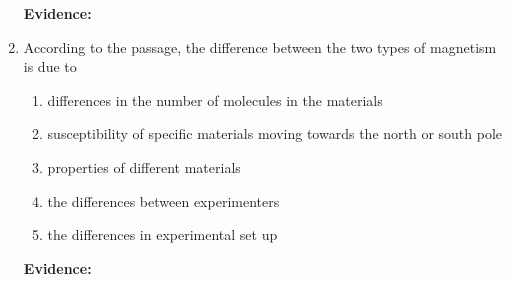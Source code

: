 \begin{enumerate}
\bigskip
\textbf{Evidence:} \hrulefill

\item According to the passage, the difference between the two types of magnetism is due to

\bigskip
\begin{enumerate}[label=(\Alph*)]
\item differences in the number of molecules in the materials
\item susceptibility of specific materials moving towards the north or south pole
\item properties of different materials
\item the differences between experimenters
\item the differences in experimental set up
\end{enumerate}

\bigskip
\textbf{Evidence:} \hrulefill

\end{enumerate}
